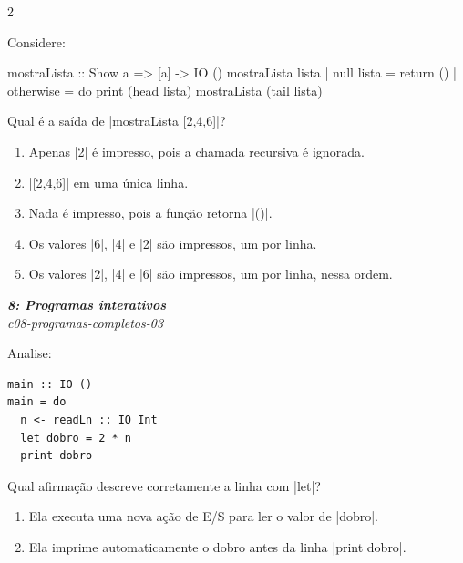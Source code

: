 \documentclass[a4paper,10pt,brazil]{article}
\begin{document}
\begin{multicols}{2}
\begin{flushright}
\end{flushright}
Considere:

\begin{haskellcode}
mostraLista :: Show a => [a] -> IO ()
mostraLista lista
  | null lista = return ()
  | otherwise = do
      print (head lista)
      mostraLista (tail lista)
\end{haskellcode}

Qual é a saída de \haskellinline|mostraLista [2,4,6]|?

\begin{enumerate}
  \item Apenas \haskellinline|2| é impresso, pois a chamada recursiva é ignorada.

  \item \haskellinline|[2,4,6]| em uma única linha.

  \item Nada é impresso, pois a função retorna \haskellinline|()|.

  \item Os valores \haskellinline|6|, \haskellinline|4| e \haskellinline|2| são impressos, um por linha.

  \item Os valores \haskellinline|2|, \haskellinline|4| e \haskellinline|6| são impressos, um por linha, nessa ordem.


\end{enumerate}

\begin{flushright}
  \footnotesize
  \textit{\textbf{8: Programas interativos}}\\
  \textit{c08-programas-completos-03}\\

\end{flushright}
Analise:

\begin{verbatim}
main :: IO ()
main = do
  n <- readLn :: IO Int
  let dobro = 2 * n
  print dobro
\end{verbatim}

Qual afirmação descreve corretamente a linha com \haskellinline|let|?

\begin{enumerate}
  \item Ela executa uma nova ação de E/S para ler o valor de \haskellinline|dobro|.

  \item Ela imprime automaticamente o dobro antes da linha \haskellinline|print dobro|.


\end{enumerate}
\end{multicols}
\end{document}

